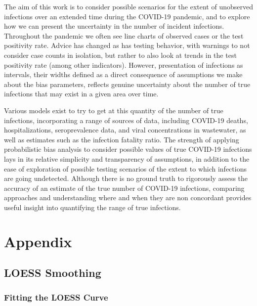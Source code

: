 \documentclass[12pt,twoside]{smiththesis}
\begin{document}
The aim of this work is to consider possible scenarios for the extent of unobserved infections over an extended time during the COVID-19 pandemic, and to explore how we can present the uncertainty in the number of incident infections. Throughout the pandemic we often see line charts of observed cases or the test positivity rate. Advice has changed as has testing behavior, with warnings to not consider case counts in isolation, but rather to also look at trends in the test positivity rate (among other indicators). However, presentation of infections as intervals, their widths defined as a direct consequence of assumptions we make about the bias parameters, reflects genuine uncertainty about the number of true infections that may exist in a given area over time.

Various models exist to try to get at this quantity of the number of true infections, incorporating a range of sources of data, including COVID-19 deaths, hospitalizations, seroprevalence data, and viral concentrations in wastewater, as well as estimates such as the infection fatality ratio.
The strength of applying probabilistic bias analysis to consider possible values of true COVID-19 infections lays in its relative simplicity and transparency of assumptions, in addition to the ease of exploration of possible testing scenarios of the extent to which infections are going undetected. Although there is no ground truth to rigorously assess the accuracy of an estimate of the true number of COVID-19 infections, comparing approaches and understanding where and when they are non concordant provides useful insight into quantifying the range of true infections.

\appendix

\hypertarget{appendix}{%
\chapter{Appendix}\label{appendix}}

\hypertarget{loess}{%
\section{LOESS Smoothing}\label{loess}}

\hypertarget{fitting-the-loess-curve}{%
\subsection{Fitting the LOESS Curve}\label{fitting-the-loess-curve}}
\end{document}
